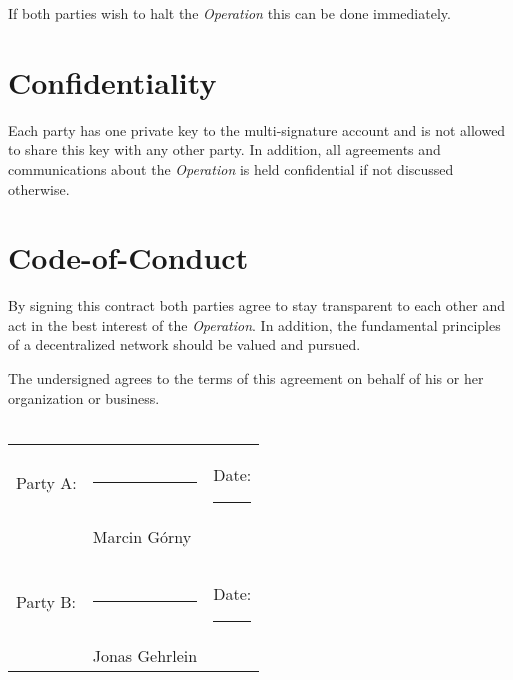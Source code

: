 \documentclass[10pt]{article}
\begin{document}
If both parties wish to halt the \textit{Operation} this can be done immediately.

\section{Confidentiality}

Each party has one private key to the multi-signature account and is not allowed to share this key with any other party. In addition, all agreements and communications about the \textit{Operation} is held confidential if not discussed otherwise.

\section{Code-of-Conduct}
By signing this contract both parties agree to stay transparent to each other and act in the best interest of the \textit{Operation}. In addition, the fundamental principles of a decentralized network should be valued and pursued.

\vspace{1cm} 

\noindent The undersigned agrees to the terms of this agreement on behalf of his or
her organization or business.\\\\

\noindent \begin{tabular}{l l l}
Party A: & \rule{6cm}{.2pt} & Date: \rule{2.4cm}{.2pt}\\
                         & Marcin Górny      & \\\\\\
Party B:          & \rule{6cm}{.2pt} & Date: \rule{2.4cm}{.2pt}\\
                         & Jonas Gehrlein      & \\
\end{tabular}
\end{document}
